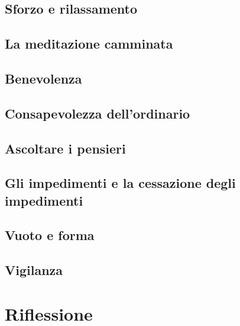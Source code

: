 \documentclass[11pt,twoside,draft]{memoir}
\begin{document}
\chapter{Sforzo e rilassamento}


\chapter{La meditazione camminata}


\chapter{Benevolenza}


\chapter{Consapevolezza dell'ordinario}


\chapter{Ascoltare i pensieri}


\chapter{Gli impedimenti e la cessazione degli impedimenti}


\chapter{Vuoto e forma}


\chapter{Vigilanza}



\part{Riflessione}
\end{document}

